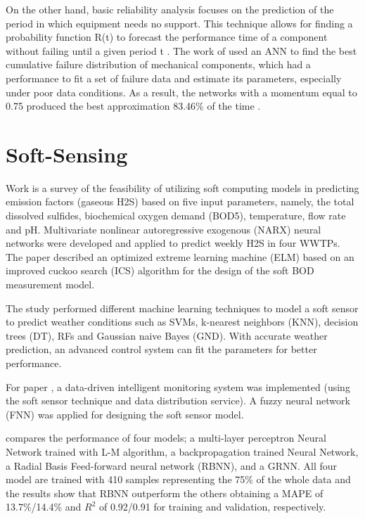  On the other hand, basic reliability analysis focuses on the prediction of the period in which equipment needs no support. This technique allows for finding a probability function R(t) to forecast the performance time of a component without failing until a given period t \cite{Alsina2018}. The work of \cite{Alsina2016} used an ANN to find the best cumulative failure distribution of mechanical components, which had a performance to fit a set of failure data and estimate its parameters, especially under poor data conditions. As a result, the networks with a momentum equal to 0.75 produced the best approximation 83.46\% of the time \cite{Alsina2016}.


\section{Soft-Sensing}
\label{s:Related-Works-SoftSensing}

Work \cite{Zounemat-Kermani2019} is a survey of the feasibility of utilizing soft computing models in predicting emission factors (gaseous H2S) based on five input parameters, namely, the total dissolved sulfides, biochemical oxygen demand (BOD5), temperature, flow rate and pH. Multivariate nonlinear autoregressive exogenous (NARX) neural networks were developed and applied to predict weekly H2S in four WWTPs. The paper \cite{Yu2019} described an optimized extreme learning machine (ELM) based on an improved cuckoo search (ICS) algorithm for the design of the soft BOD measurement model.

The study \cite{Hernandez-del-Olmo2019} performed different machine learning techniques to model a soft sensor to predict weather conditions such as SVMs, k-nearest neighbors (KNN), decision trees (DT), RFs and Gaussian naive Bayes (GND). With accurate weather prediction, an advanced control system can fit the parameters for better performance.

For paper \cite{Han2018}, a data-driven intelligent monitoring system was implemented (using the soft sensor technique and data distribution service). A fuzzy neural network (FNN) was applied for designing the soft sensor model.

\cite{Shen2018} compares the performance of four models; a multi-layer perceptron Neural Network trained with L-M algorithm, a backpropagation trained Neural Network, a Radial Basis Feed-forward neural network (RBNN), and a GRNN. All four model are trained with 410 samples representing the 75\% of the whole data and the results show that RBNN outperform the others obtaining a MAPE of 13.7\%/14.4\% and \begin{math}R^2\end{math} of 0.92/0.91 for training and validation, respectively.


